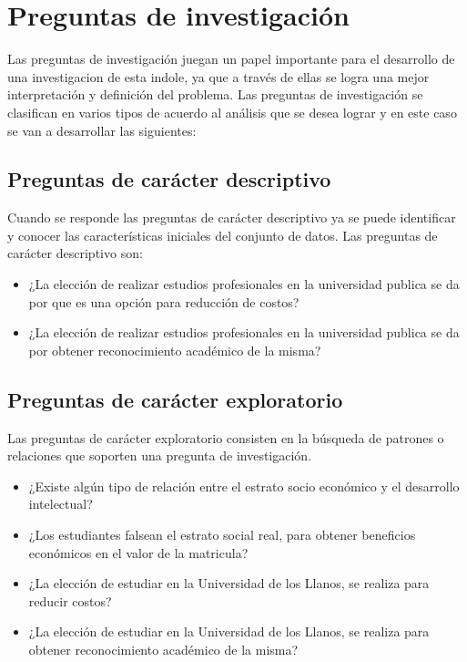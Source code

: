 

\section{Preguntas de investigación}
Las preguntas de investigación juegan un papel importante para el desarrollo de una investigacion de esta indole, ya que a través de ellas se logra una mejor interpretación  y definición del problema.  Las preguntas de investigación se clasifican en varios tipos de acuerdo al análisis que se desea lograr y en este caso se van a desarrollar las siguientes:
 \subsection{Preguntas de carácter descriptivo}
 Cuando se responde las preguntas de carácter descriptivo ya se puede identificar y conocer las características iniciales del conjunto de datos. Las preguntas de carácter descriptivo son:
  \begin{itemize}
	 \item ¿La elección de realizar estudios profesionales en la universidad publica se da por que es una opción para reducción de costos?
	 \item ¿La elección de realizar estudios profesionales en la universidad publica se da por obtener reconocimiento académico de la misma?
  	
  \end{itemize}
  \subsection{Preguntas de carácter exploratorio}
   Las preguntas de carácter exploratorio consisten en la búsqueda de patrones o relaciones que soporten una pregunta de investigación.
   	  \begin{itemize}
  	  	\item ¿Existe algún tipo de relación entre el estrato socio económico y el desarrollo intelectual?
  	  	\item ¿Los estudiantes falsean el estrato social real, para obtener beneficios económicos en el valor de la matricula?
  	  	\item ¿La elección de estudiar en la Universidad de los Llanos, se realiza para reducir costos?
  	  	\item ¿La elección de estudiar en la Universidad de los Llanos, se realiza para obtener reconocimiento académico de la misma?
  	  \end{itemize}

